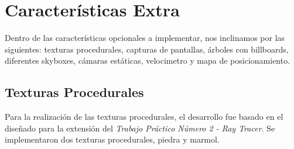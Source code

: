 \documentclass[a4paper,10pt]{article}
\begin{document}
\section{Caracter\'isticas Extra}
\label{caracteristicas}

Dentro de las caracter\'isticas opcionales a implementar, nos inclinamos
por las siguientes: texturas procedurales, capturas de pantallas, \'arboles con
billboards, diferentes skyboxes, c\'amaras est\'aticas, velocimetro y mapa de
posicionamiento.


\subsection{Texturas Procedurales}

Para la realizaci\'on de las texturas procedurales, el desarrollo fue basado en
el dise\~nado para la extensi\'on del \textit{Trabajo Pr\'actico N\'umero 2 -
Ray
Tracer}.  Se implementaron dos texturas procedurales, piedra y marmol.
\end{document}

